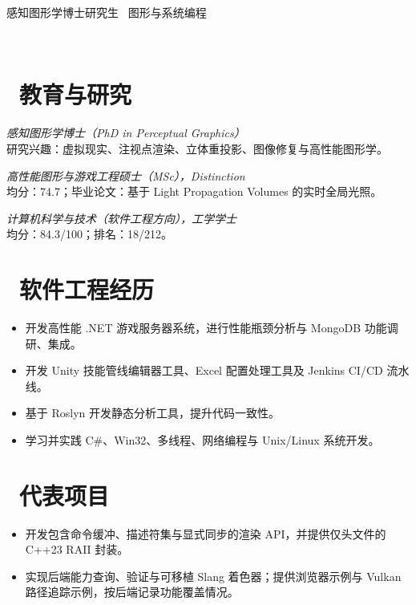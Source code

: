 \documentclass{resume}
\begin{document}
\centerline{感知图形学博士研究生 \textperiodcentered\ 图形与系统编程}
\centerline{ \textperiodcentered\ }

\section{\faGraduationCap\ 教育与研究}
\textit{感知图形学博士（PhD in Perceptual Graphics）}\\
研究兴趣：虚拟现实、注视点渲染、立体重投影、图像修复与高性能图形学。

\textit{高性能图形与游戏工程硕士（MSc），Distinction}\\
均分：74.7；毕业论文：基于 Light Propagation Volumes 的实时全局光照。

\textit{计算机科学与技术（软件工程方向），工学学士}\\
均分：84.3/100；排名：18/212。

\section{\faUsers\ 软件工程经历}
\begin{itemize}
  \item 开发高性能 .NET 游戏服务器系统，进行性能瓶颈分析与 MongoDB 功能调研、集成。
  \item 开发 Unity 技能管线编辑器工具、Excel 配置处理工具及 Jenkins CI/CD 流水线。
  \item 基于 Roslyn 开发静态分析工具，提升代码一致性。
\end{itemize}
\begin{itemize}
  \item 学习并实践 C\#、Win32、多线程、网络编程与 Unix/Linux 系统开发。
\end{itemize}

\section{\faCogs\ 代表项目}
\begin{itemize}
  \item 开发包含命令缓冲、描述符集与显式同步的渲染 API，并提供仅头文件的 C++23 RAII 封装。
  \item 实现后端能力查询、验证与可移植 Slang 着色器；提供浏览器示例与 Vulkan 路径追踪示例，按后端记录功能覆盖情况。
\end{itemize}
\end{document}
